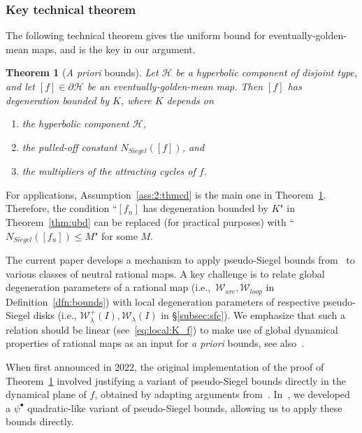 \documentclass[11pt, reqno]{amsart}
\numberwithin{equation}{section}
\theoremstyle{plain}
\theoremstyle{theorem}
\theoremstyle{plain}
\newtheorem{maintheorem}{Theorem}
\theoremstyle{definition}
\numberwithin{figure}{section}
\begin{document}
\subsubsection{Key technical theorem}\label{sss:ThmC} The following technical theorem gives the uniform bound for eventually-golden-mean maps, and is the key in our argument.
\begin{maintheorem}[\emph{A priori} bounds]\label{thm:cd}
Let $\mathcal{H}$ be a hyperbolic component of disjoint type, and let $[f] \in \partial \mathcal{H}$ be an eventually-golden-mean map.
Then $[f]$ has degeneration bounded by $K$, where $K$ depends on 
\begin{enumerate}
    \item the hyperbolic component $\mathcal{H}$,
    \item\label{ass:2:thmcd} the pulled-off constant $N_{Siegel}([f])$, and
    \item the multipliers of the attracting cycles of $f$.
\end{enumerate}
\end{maintheorem}

\noindent For applications, Assumption~\eqref{ass:2:thmcd} is the main one in Theorem~\ref{thm:cd}. Therefore, the condition ``$[f_n]$ has degeneration bounded by $K$" in Theorem~\ref{thm:ubd} can be replaced (for practical purposes) with ``$N_{Siegel}([f_n])\le M$" for some $M$.



The current paper develops a mechanism to apply pseudo-Siegel bounds from~\cite{DL22} to various classes of neutral rational maps.  A key challenge is to relate global degeneration parameters of a rational map (i.e.,~$\mathcal{W}_{arc},\mathcal{W}_{loop}$ in Definition~\ref{dfn:bounds}) with local degeneration parameters of respective pseudo-Siegel disks (i.e., $\mathcal{W}_{\lambda}^+(I),\mathcal{W}_{\lambda}(I)$ in \S\ref{subsec:sfc}). We emphasize that such a relation should be linear (see~\eqref{eq:local:K_f}) to make use of global dynamical properties of rational maps as an input for \emph{a priori} bounds, see also~\cite[\S7.4]{DLL25}. 


When first announced in 2022, the original implementation of the proof of Theorem~\ref{thm:cd} involved justifying a variant of pseudo-Siegel bounds directly in the dynamical plane of $f$, obtained by adapting arguments from~\cite{DL22}. In~\cite{DLL25}, we developed a $\psi^\bullet$ quadratic-like variant of pseudo-Siegel bounds, allowing us to apply these bounds directly. 
\end{document}
